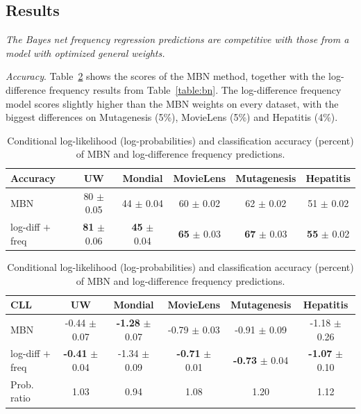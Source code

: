 \documentclass[runningheads,a4paper]{llncs}
\newcommand{\point}[1]{\noindent\emph{#1}.}
\newcommand{\keypoint}[1]{{\em #1}}
\begin{document}
\subsection{Results}

\keypoint{The Bayes net frequency regression predictions are competitive with those from a model with optimized general weights.}

\point{Accuracy} Table~\ref{table:mbn} shows the scores of the MBN method, together with the log-difference frequency results from Table~\ref{table:bn}. The log-difference frequency model scores slightly higher than the MBN weights on every dataset, with the biggest differences on Mutagenesis (5\%),  MovieLens (5\%) and Hepatitis (4\%). 

\begin{table}[thbp]

\caption{Conditional log-likelihood (log-probabilities) and classification accuracy (percent) of MBN and log-difference frequency predictions.}

\begin{center}

\begin{tabular}{|l|c|c|c|c|c|}
\hline
Accuracy& UW & Mondial & MovieLens & Mutagenesis & Hepatitis \\\hline
MBN & 80 $\pm$ 0.05 & 44 $\pm$ 0.04 & 60 $\pm$ 0.02 & 62 $\pm$ 0.02 & 51 $\pm$ 0.02 \\\hline
log-diff $+$ freq & \textbf{81} $\pm$ 0.06 & \textbf{45} $\pm$ 0.04 & \textbf{65} $\pm$ 0.03 & \textbf{67} $\pm$ 0.03 & \textbf{55} $\pm$ 0.02 \\
\hline
\end{tabular}
\end{center}


\begin{center}
\begin{tabular}{|l|c|c|c|c|c|}
\hline
CLL & UW & Mondial & MovieLens & Mutagenesis & Hepatitis \\\hline
MBN & -0.44 $\pm$ 0.07 & \textbf{-1.28} $\pm$ 0.07 & -0.79 $\pm$ 0.03 & -0.91 $\pm$ 0.09 & -1.18 $\pm$ 0.26 \\
log-diff $+$ freq & \textbf{-0.41} $\pm$ 0.04 & -1.34 $\pm$ 0.09 & \textbf{-0.71} $\pm$ 0.01 & \textbf{-0.73} $\pm$ 0.04 & \textbf{-1.07} $\pm$ 0.10 \\
Prob. ratio & 1.03 & 0.94 & 1.08 & 1.20 & 1.12\\
\hline
\end{tabular}
\end{center}
\label{table:mbn}

\end{table}%
\end{document}
